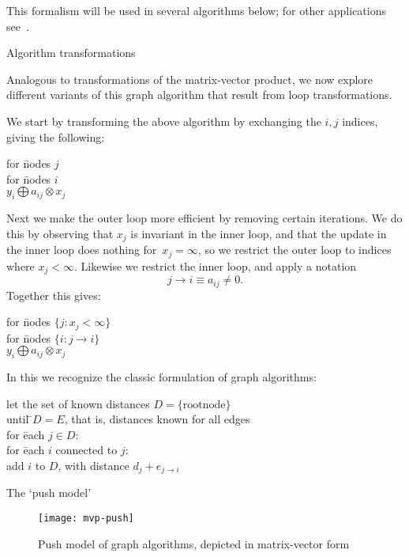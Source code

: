 This formalism will be used in several algorithms below;
for other applications see~\cite{Kung:pegasus2009}.

 {Algorithm transformations}

Analogous to transformations of the matrix-vector product,
we now explore different variants of this graph algorithm
that result from loop transformations.

We start by transforming the above algorithm by exchanging the $i,j$ indices,
giving the following:

\begin{tabbing}
for \=nodes $j$\\
\> for \=nodes $i$\\
\>\> $y_i \bigoplus a_{ij}\otimes x_j$
\end{tabbing}

Next we make the outer loop more efficient by removing
certain iterations.
We do this by observing that $x_j$ is invariant in the inner loop,
and that the update in the inner loop does nothing
for~$x_j=\infty$, so we restrict the outer loop to
indices where $x_j<\infty$.
Likewise we restrict the inner loop, and apply a notation
\[ j\rightarrow i \equiv a_{ij}\not=0. \]
Together this gives:

\begin{tabbing}
for \=nodes $\{j\colon x_j<\infty\}$\\
\> for \=nodes $\{i\colon j\rightarrow i\}$\\
\>\> $y_i \bigoplus a_{ij}\otimes x_j$\\
\end{tabbing}

In this we recognize the classic formulation of graph algorithms:

\begin{tabbing}
let the set of known distances $D=\{ \mathrm{root node} \}$\\
until \=$D=E$, that is, distances known for all edges\\
\>for \=each $j\in D$:\\
\>\>for \=each $i$ connected to $j$:\\
\>\>\>add $i$ to $D$, with distance $d_j+e_{j\rightarrow i}$\\
\end{tabbing}

 {The `push model'}

\begin{figure}[ht]
  \texttt{[image: mvp-push]}
  \caption{Push model of graph algorithms, depicted in matrix-vector form}
  \label{fig:mvp-push}
\end{figure}

